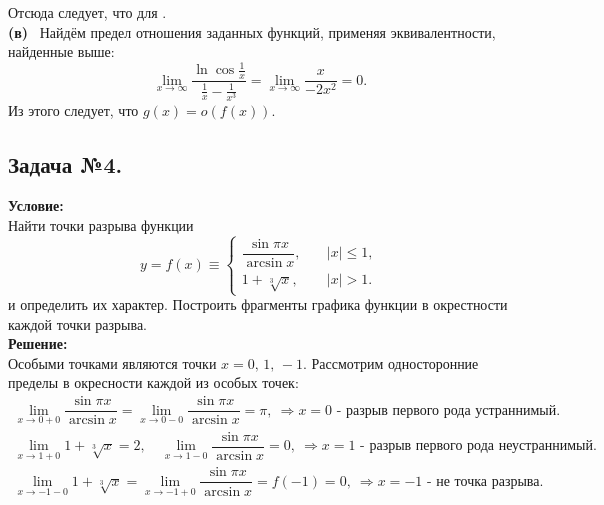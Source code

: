 Отсюда следует, что для .\\
\textbf{(в)}~ Найдём предел отношения заданных функций, применяя эквивалентности, найденные выше:
$$
\lim\limits_{x \to \infty}\dfrac{\ln{\cos{\frac{1}{x}}}}{\frac{1}{x}-\frac{1}{x^3}} = 
\lim\limits_{x \to \infty}\dfrac{x}{-2x^2} = 0.
$$
Из этого следует, что $g(x) = o(f(x))$.
\newpage
\subsection*{\center Задача №4.}
\textbf{Условие:}\\
Найти точки разрыва функции 
$$
y = f(x) \equiv 
\begin{cases}
	\dfrac{\sin{\pi x}}{\arcsin{x}},&\quad |x|\leq 1, \\[10pt]
	1+\sqrt[3]{x},&\quad |x|>1.
\end{cases}
$$ 
и определить их характер. Построить фрагменты графика функции в окрестности каждой точки разрыва. \\
\textbf {Решение:}\\
Особыми точками являются точки $x=0,\,1,\,-1$. Рассмотрим односторонние пределы в окресности каждой из особых точек:
$$
\begin{array}{l}
	\lim\limits_{x\to0+0}\dfrac{\sin{\pi x}}{\arcsin{x}}=
	\lim\limits_{x\to0-0}\dfrac{\sin{\pi x}}{\arcsin{x}}=
	\pi, ~ \Rightarrow x = 0 \text{ - разрыв первого рода устраннимый.}\\[10pt]
	\lim\limits_{x\to1+0}1+\sqrt[3]{x} = 2, \quad \lim\limits_{x\to1-0}\dfrac{\sin{\pi x}}{\arcsin{x}} = 0, ~ \Rightarrow x = 1 \text{ - разрыв первого рода неустраннимый.}\\[10pt]
	\lim\limits_{x\to-1-0}1+\sqrt[3]{x} =\lim\limits_{x\to-1+0}\dfrac{\sin{\pi x}}{\arcsin{x}} = f(-1) = 0, ~ \Rightarrow x = -1 \text{ - не точка разрыва.} 
\end{array}
$$
\begin{center}
\end{center}